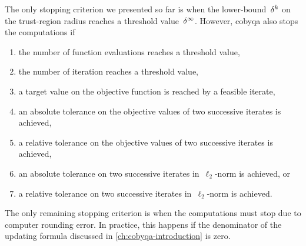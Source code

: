 The only stopping criterion we presented so far is when the lower-bound~$\radlb[k]$ on the trust-region radius reaches a threshold value~$\radlb[\infty]$.
However, \gls{cobyqa} also stops the computations if
\begin{enumerate}
    \item the number of function evaluations reaches a threshold value,
    \item the number of iteration reaches a threshold value,
    \item a target value on the objective function is reached by a feasible iterate,
    \item an absolute tolerance on the objective values of two successive iterates is achieved,
    \item a relative tolerance on the objective values of two successive iterates is achieved,
    \item an absolute tolerance on two successive iterates in~$\ell_2$-norm is achieved, or
    \item a relative tolerance on two successive iterates in~$\ell_2$-norm is achieved.
\end{enumerate}
The only remaining stopping criterion is when the computations must stop due to computer rounding error.
In practice, this happens if the denominator of the updating formula discussed in \cref{ch:cobyqa-introduction} is zero.

